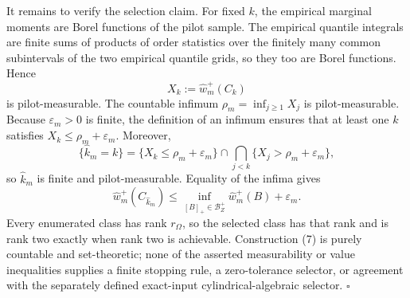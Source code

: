 It remains to verify the selection claim.  For fixed \(k\), the empirical marginal moments are Borel functions of the pilot sample.  The empirical quantile integrals are finite sums of products of order statistics over the finitely many common subintervals of the two empirical quantile grids, so they too are Borel functions.  Hence
\[
X_k:=\widehat w_m^+(C_k)
\]
is pilot-measurable.  The countable infimum \(\rho_m=\inf_{j\ge1}X_j\) is pilot-measurable.  Because \(\varepsilon_m>0\) is finite, the definition of an infimum ensures that at least one \(k\) satisfies \(X_k\le\rho_m+\varepsilon_m\).  Moreover,
\[
\{\widehat k_m=k\}
=\{X_k\le\rho_m+\varepsilon_m\}
\cap\bigcap_{j<k}\{X_j>\rho_m+\varepsilon_m\},
\tag{7}
\]
so \(\widehat k_m\) is finite and pilot-measurable.  Equality of the infima gives
\[
\widehat w_m^+(C_{\widehat k_m})
\le
\inf_{[B]_+\in\mathcal B_Z^+}\widehat w_m^+(B)
+\varepsilon_m.
\tag{8}
\]
Every enumerated class has rank \(r_\Omega\), so the selected class has that rank and is rank two exactly when rank two is achievable.  Construction (7) is purely countable and set-theoretic; none of the asserted measurability or value inequalities supplies a finite stopping rule, a zero-tolerance selector, or agreement with the separately defined exact-input cylindrical-algebraic selector. \(\square\)